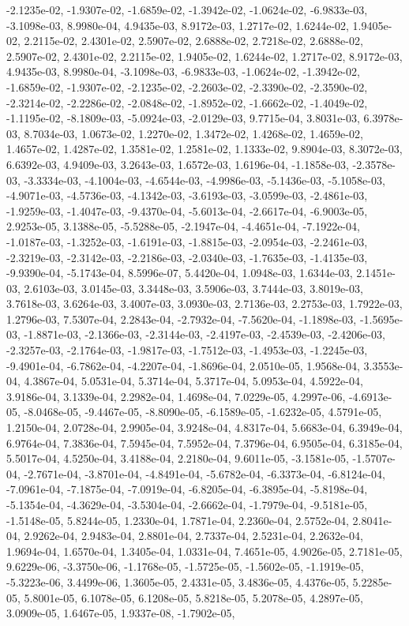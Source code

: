 \documentclass[12pt,fleqn]{article}
\begin{document}
\begin{enumerate}
-2.1235e-02, -1.9307e-02, -1.6859e-02, -1.3942e-02, -1.0624e-02, -6.9833e-03, -3.1098e-03,  8.9980e-04,  4.9435e-03,  8.9172e-03,  1.2717e-02,  1.6244e-02,  1.9405e-02,  2.2115e-02,  2.4301e-02,  2.5907e-02,  2.6888e-02,  2.7218e-02,  2.6888e-02,  2.5907e-02,  2.4301e-02,  2.2115e-02,  1.9405e-02,  1.6244e-02,  1.2717e-02,  8.9172e-03,  4.9435e-03,  8.9980e-04, -3.1098e-03, -6.9833e-03, -1.0624e-02,  -1.3942e-02, -1.6859e-02, -1.9307e-02, -2.1235e-02, -2.2603e-02, -2.3390e-02, -2.3590e-02, -2.3214e-02,  -2.2286e-02, -2.0848e-02, -1.8952e-02, -1.6662e-02, -1.4049e-02, -1.1195e-02, -8.1809e-03, -5.0924e-03,  -2.0129e-03,  9.7715e-04,  3.8031e-03,  6.3978e-03,  8.7034e-03,  1.0673e-02,  1.2270e-02,  1.3472e-02,  1.4268e-02,  1.4659e-02,  1.4657e-02,  1.4287e-02,  1.3581e-02,  1.2581e-02,  1.1333e-02,  9.8904e-03,  8.3072e-03,  6.6392e-03,  4.9409e-03,  3.2643e-03,  1.6572e-03,  1.6196e-04, -1.1858e-03, -2.3578e-03,  -3.3334e-03, -4.1004e-03, -4.6544e-03, -4.9986e-03, -5.1436e-03, -5.1058e-03, -4.9071e-03, -4.5736e-03,  -4.1342e-03, -3.6193e-03, -3.0599e-03, -2.4861e-03, -1.9259e-03, -1.4047e-03, -9.4370e-04, -5.6013e-04,  -2.6617e-04, -6.9003e-05,  2.9253e-05,  3.1388e-05, -5.5288e-05, -2.1947e-04, -4.4651e-04, -7.1922e-04,  -1.0187e-03, -1.3252e-03, -1.6191e-03, -1.8815e-03, -2.0954e-03, -2.2461e-03, -2.3219e-03, -2.3142e-03,  -2.2186e-03, -2.0340e-03, -1.7635e-03, -1.4135e-03, -9.9390e-04, -5.1743e-04,  8.5996e-07,  5.4420e-04,  1.0948e-03,  1.6344e-03,  2.1451e-03,  2.6103e-03,  3.0145e-03,  3.3448e-03,  3.5906e-03,  3.7444e-03,  3.8019e-03,  3.7618e-03,  3.6264e-03,  3.4007e-03,  3.0930e-03,  2.7136e-03,  2.2753e-03,  1.7922e-03,  1.2796e-03,  7.5307e-04,  2.2843e-04, -2.7932e-04, -7.5620e-04, -1.1898e-03, -1.5695e-03, -1.8871e-03,  -2.1366e-03, -2.3144e-03, -2.4197e-03, -2.4539e-03, -2.4206e-03, -2.3257e-03, -2.1764e-03, -1.9817e-03,  -1.7512e-03, -1.4953e-03, -1.2245e-03, -9.4901e-04, -6.7862e-04, -4.2207e-04, -1.8696e-04,  2.0510e-05,  1.9568e-04,  3.3553e-04,  4.3867e-04,  5.0531e-04,  5.3714e-04,  5.3717e-04,  5.0953e-04,  4.5922e-04,  3.9186e-04,  3.1339e-04,  2.2982e-04,  1.4698e-04,  7.0229e-05,  4.2997e-06, -4.6913e-05, -8.0468e-05,  -9.4467e-05, -8.8090e-05, -6.1589e-05, -1.6232e-05,  4.5791e-05,  1.2150e-04,  2.0728e-04,  2.9905e-04,  3.9248e-04,  4.8317e-04,  5.6683e-04,  6.3949e-04,  6.9764e-04,  7.3836e-04,  7.5945e-04,  7.5952e-04,  7.3796e-04,  6.9505e-04,  6.3185e-04,  5.5017e-04,  4.5250e-04,  3.4188e-04,  2.2180e-04,  9.6011e-05,  -3.1581e-05, -1.5707e-04, -2.7671e-04, -3.8701e-04, -4.8491e-04, -5.6782e-04, -6.3373e-04, -6.8124e-04,  -7.0961e-04, -7.1875e-04, -7.0919e-04, -6.8205e-04, -6.3895e-04, -5.8198e-04, -5.1354e-04, -4.3629e-04,  -3.5304e-04, -2.6662e-04, -1.7979e-04, -9.5181e-05, -1.5148e-05,  5.8244e-05,  1.2330e-04,  1.7871e-04,  2.2360e-04,  2.5752e-04,  2.8041e-04,  2.9262e-04,  2.9483e-04,  2.8801e-04,  2.7337e-04,  2.5231e-04,  2.2632e-04,  1.9694e-04,  1.6570e-04,  1.3405e-04,  1.0331e-04,  7.4651e-05,  4.9026e-05,  2.7181e-05,  9.6229e-06, -3.3750e-06, -1.1768e-05, -1.5725e-05, -1.5602e-05, -1.1919e-05, -5.3223e-06,  3.4499e-06,  1.3605e-05,  2.4331e-05,  3.4836e-05,  4.4376e-05,  5.2285e-05,  5.8001e-05,  6.1078e-05,  6.1208e-05,  5.8218e-05,  5.2078e-05,  4.2897e-05,  3.0909e-05,  1.6467e-05,  1.9337e-08, -1.7902e-05, 
\end{enumerate}
\end{document}
